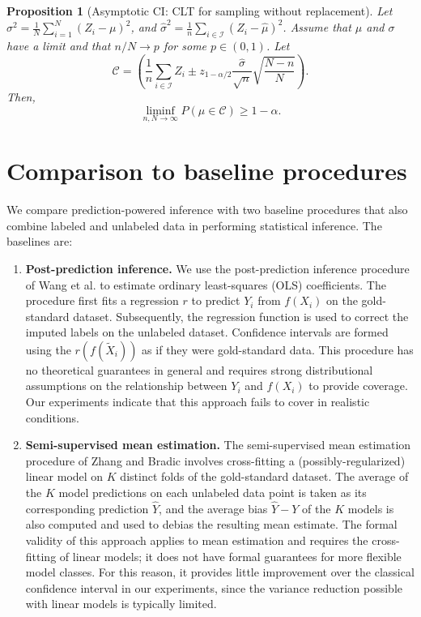 \documentclass[10pt]{article}
\newtheorem{prop}{Proposition}
\def\Ical{\mathcal{I}}
\newcommand{\C}{\mathcal{C}}
\newcommand{\Xt}{\widetilde{X}}
\begin{document}
\begin{prop}[Asymptotic CI: CLT for sampling without replacement]
\label{prop:finite-partial-sum-concentration}
Let $\sigma^2 = \frac 1 N \sum_{i=1}^N (Z_i - \mu)^2$, and $\hat{\sigma}^2 = \frac 1 n \sum_{i \in \Ical} (Z_i - \hat{\mu})^2$.
Assume that $\mu$ and $\sigma$ have a limit and that $n/N\rightarrow p$ for some $p\in(0,1)$. Let
$$\C = \left(\frac{1}{n}\sum\limits_{i \in \Ical} Z_i \pm z_{1-\alpha/2} \frac{\hat{\sigma}}{\sqrt{n}} \sqrt{\frac{N-n}{N}} \right).$$
Then,
\begin{equation}
    \liminf_{n,N\rightarrow\infty} P\left( \mu \in \C \right) \geq 1-\alpha.
\end{equation}
\end{prop}




\section{Comparison to baseline procedures}
\label{app:comparisons}

We compare prediction-powered inference with two baseline procedures that also combine labeled and unlabeled data in performing statistical inference. The baselines are:
\begin{enumerate}
    \item \textbf{Post-prediction inference.} We use the post-prediction inference procedure of Wang et al. \cite{wang2020methods} to estimate ordinary least-squares (OLS) coefficients. The procedure first fits a regression $r$ to predict $Y_i$ from $f(X_i)$ on the gold-standard dataset. Subsequently, the regression function is used to correct the imputed labels on the unlabeled dataset. Confidence intervals are formed using the $r(f(\Xt_i))$ as if they were gold-standard data. This procedure has no theoretical guarantees in general and requires strong distributional assumptions on the relationship between $Y_i$ and $f(X_i)$ to provide coverage. Our experiments indicate that this approach fails to cover in realistic conditions.
    \item \textbf{Semi-supervised mean estimation.} The semi-supervised mean estimation procedure of Zhang and Bradic \cite{zhang2022high} involves cross-fitting a (possibly-regularized) linear model on $K$ distinct folds of the gold-standard dataset. The average of the $K$ model predictions on each unlabeled data point is taken as its corresponding prediction $\hat Y$, and the average bias $\hat{Y}-Y$ of the $K$ models is also computed and used to debias the resulting mean estimate. The formal validity of this approach applies to mean estimation and requires the cross-fitting of linear models; it does not have formal guarantees for more flexible model classes. For this reason, it provides little improvement over the classical confidence interval in our experiments, since the variance reduction possible with linear models is typically limited.
\end{enumerate}
\end{document}
